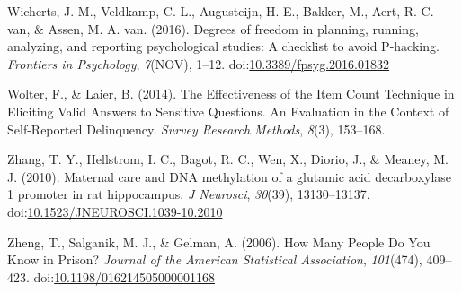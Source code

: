 \documentclass[jou]{apa6}
\theoremstyle{definition}
\theoremstyle{definition}
\theoremstyle{definition}
\theoremstyle{remark}
\begin{document}
\hypertarget{ref-Wicherts2016}{}
Wicherts, J. M., Veldkamp, C. L., Augusteijn, H. E., Bakker, M., Aert,
R. C. van, \& Assen, M. A. van. (2016). Degrees of freedom in planning,
running, analyzing, and reporting psychological studies: A checklist to
avoid P-hacking. \emph{Frontiers in Psychology}, \emph{7}(NOV), 1--12.
doi:\href{https://doi.org/10.3389/fpsyg.2016.01832}{10.3389/fpsyg.2016.01832}

\hypertarget{ref-Wolter2014}{}
Wolter, F., \& Laier, B. (2014). The Effectiveness of the Item Count
Technique in Eliciting Valid Answers to Sensitive Questions. An
Evaluation in the Context of Self-Reported Delinquency. \emph{Survey
Research Methods}, \emph{8}(3), 153--168.

\hypertarget{ref-Zhang2010}{}
Zhang, T. Y., Hellstrom, I. C., Bagot, R. C., Wen, X., Diorio, J., \&
Meaney, M. J. (2010). Maternal care and DNA methylation of a glutamic
acid decarboxylase 1 promoter in rat hippocampus. \emph{J Neurosci},
\emph{30}(39), 13130--13137.
doi:\href{https://doi.org/10.1523/JNEUROSCI.1039-10.2010}{10.1523/JNEUROSCI.1039-10.2010}

\hypertarget{ref-Zheng2006}{}
Zheng, T., Salganik, M. J., \& Gelman, A. (2006). How Many People Do You
Know in Prison? \emph{Journal of the American Statistical Association},
\emph{101}(474), 409--423.
doi:\href{https://doi.org/10.1198/016214505000001168}{10.1198/016214505000001168}

\endgroup
\end{document}
